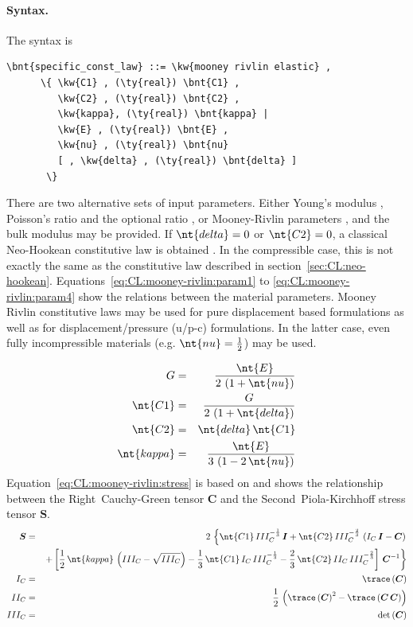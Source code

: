 \paragraph{Syntax.}
The syntax is
\begin{Verbatim}[commandchars=\\\{\}]
    \bnt{specific_const_law} ::= \kw{mooney rivlin elastic} ,
      \{ \kw{C1} , (\ty{real}) \bnt{C1} ,
         \kw{C2} , (\ty{real}) \bnt{C2} ,
         \kw{kappa}, (\ty{real}) \bnt{kappa} |
         \kw{E} , (\ty{real}) \bnt{E} ,
         \kw{nu} , (\ty{real}) \bnt{nu}
         [ , \kw{delta} , (\ty{real}) \bnt{delta} ]
       \}
\end{Verbatim}
There are two alternative sets of input parameters.
Either Young's modulus , Poisson's ratio  and the optional ratio ,
or Mooney-Rivlin parameters ,  and the bulk modulus  may be provided.
If $\nt{delta}=0$ or $\nt{C2}=0$, a classical Neo-Hookean constitutive law is obtained \cite{BATHE2016}.
In the compressible case, this is not exactly the same as the constitutive law described
in section~\ref{sec:CL:neo-hookean}.
Equations~\ref{eq:CL:mooney-rivlin:param1} to \ref{eq:CL:mooney-rivlin:param4} show the relations between the material parameters.
Mooney Rivlin constitutive laws may be used for pure displacement based formulations
as well as for displacement/pressure (u/p-c) formulations.
In the latter case, even fully incompressible materials (e.g. $\nt{nu} = \frac{1}{2}$) may be used.

\begin{eqnarray}
  G & = & \frac{\nt{E}}{2\,\left(1 + \nt{nu}\right)} \label{eq:CL:mooney-rivlin:param1} \\
  \nt{C1} & = & \frac{G}{2\,\left(1 + \nt{delta}\right)} \\
  \nt{C2} & = & \nt{delta}\,\nt{C1} \\
  \nt{kappa} & = & \frac{\nt{E}}{3\,\left(1 - 2\,\nt{nu}\right)}
  \label{eq:CL:mooney-rivlin:param4}
\end{eqnarray}
Equation~\ref{eq:CL:mooney-rivlin:stress} is based on \cite{BATHE2016} and shows the relationship
between the Right~Cauchy-Green tensor $\boldsymbol{C}$ and the Second~Piola-Kirchhoff stress tensor $\boldsymbol{S}$.
\begin{eqnarray}
  \boldsymbol{S} & = & 2\,\left\{ \nt{C1} \, III_C^{-\frac{1}{3}} \, \boldsymbol{I} + \nt{C2} \, III_C^{-\frac{2}{3}} \, \left(I_C \, \boldsymbol{I} - \boldsymbol{C} \right)\right. \nonumber \\
  & &  \left.+\left[ \frac{1}{2} \, \nt{kappa} \,\left(III_C - \sqrt{III_C}\right) - \frac{1}{3} \, \nt{C1} \, I_C \, III_C^{-\frac{1}{3}} - \frac{2}{3} \, \nt{C2} \, II_C \, III_C^{-\frac{2}{3}} \right]\, \boldsymbol{C}^{-1}\right\}
    \label{eq:CL:mooney-rivlin:stress} \\
  I_C & = & \trace\left(\boldsymbol{C}\right) \\
  II_C & = & \frac{1}{2} \,\left(\trace\left(\boldsymbol{C}\right)^2 - \trace\left(\boldsymbol{C} \, \boldsymbol{C}\right)\right) \\
  III_C & = & \det\left(\boldsymbol{C}\right)
\end{eqnarray}

